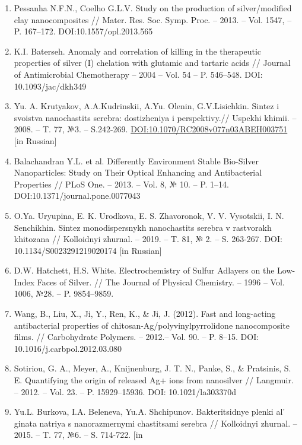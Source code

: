 \begin{enumerate}
\def\labelenumi{\arabic{enumi}.}
\item
  Pessanha N.F.N., Coelho G.L.V. Study on the production of
  silver/modified clay nanocomposites // Mater. Res. Soc. Symp. Proc. --
  2013. -- Vol. 1547, -- P. 167--172. DOI:10.1557/opl.2013.565
\item
  K.I. Baterseh. Anomaly and correlation of killing in the therapeutic
  properties of silver (I) chelation with glutamic and tartaric acids //
  Journal of Antimicrobial Chemotherapy -- 2004 -- Vol. 54 -- P.
  546--548. DOI: 10.1093/jac/dkh349
\item
  Yu. A. Krutyakov, A.A.Kudrinskii, A.Yu. Olenin, G.V.Lisichkin. Sintez
  i svoistva nanochastits serebra: dostizheniya i perspektivy.// Uspekhi
  khimii. -- 2008. -- T. 77, №3. -- S.242-269.
  \href{https://doi.org/10.1070/RC2008v077n03ABEH003751}{DOI:10.1070/RC2008v077n03ABEH003751}
  {[}in Russian{]}
\item
  Balachandran Y.L. et al. Differently Environment Stable Bio-Silver
  Nanoparticles: Study on Their Optical Enhancing and Antibacterial
  Properties // PLoS One. -- 2013. -- Vol. 8, № 10. -- P. 1--14.
  DOI:10.1371/journal.pone.0077043
\item
  O.Ya. Uryupina, E. K. Urodkova, E. S. Zhavoronok, V. V. Vysotskii, I.
  N. Senchikhin. Sintez monodispersnykh nanochastits serebra v
  rastvorakh khitozana // Kolloidnyi zhurnal. -- 2019. -- T. 81, № 2. --
  S. 263-267. DOI: 10.1134/S0023291219020174 {[}in Russian{]}
\item
  D.W. Hatchett, H.S. White. Electrochemistry of Sulfur Adlayers on the
  Low-Index Faces of Silver. // The Journal of Physical Chemistry. --
  1996 -- Vol. 1006, №28. -- P. 9854--9859.
\item
  Wang, B., Liu, X., Ji, Y., Ren, K., \& Ji, J. (2012). Fast and
  long-acting antibacterial properties of
  chitosan-Ag/polyvinylpyrrolidone nanocomposite films. // Carbohydrate
  Polymers. -- 2012.-- Vol. 90. -- P. 8--15. DOI:
  10.1016/j.carbpol.2012.03.080
\item
  Sotiriou, G. A., Meyer, A., Knijnenburg, J. T. N., Panke, S., \&
  Pratsinis, S. E. Quantifying the origin of released Ag+ ions from
  nanosilver // Langmuir. -- 2012. -- Vol. 23. -- P. 15929--15936. DOI:
  10.1021/la303370d
\item
  Yu.L. Burkova, I.A. Beleneva, Yu.A. Shchipunov. Bakteritsidnye plenki
  al' ginata natriya s nanorazmernymi chastitsami serebra
  // Kolloidnyi zhurnal. -- 2015. -- T. 77, №6. -- S. 714-722. {[}in

\end{enumerate}
